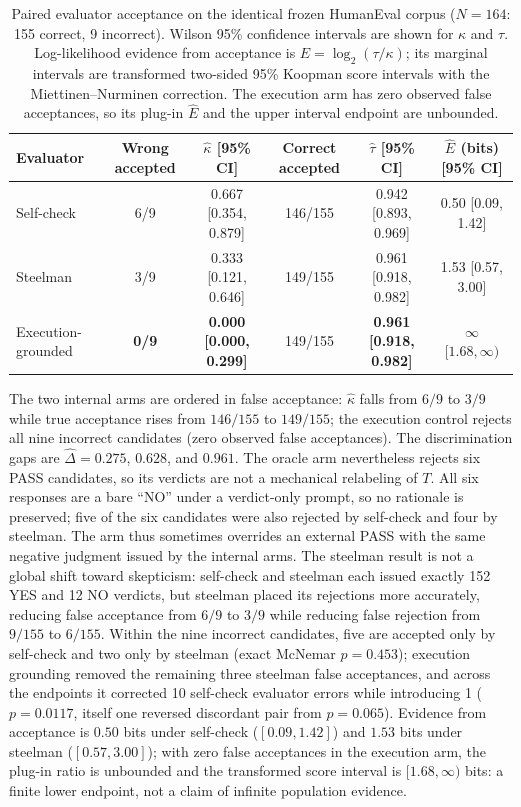 \documentclass[a4paper,journal]{IAENGtran}
\begin{document}
\begin{table}[tp]
\caption{Paired evaluator acceptance on the identical frozen HumanEval corpus
($N=164$: 155 correct, 9 incorrect). Wilson 95\% confidence intervals are shown for
$\kappa$ and $\tau$. Log-likelihood evidence from acceptance is $E=\log_2(\tau/\kappa)$;
its marginal intervals are transformed two-sided 95\% Koopman score intervals with the
Miettinen--Nurminen correction. The execution arm has zero observed false acceptances, so
its plug-in $\hat E$ and the upper interval endpoint are unbounded.}
\label{tab:results}

\begin{tabular}{l c c c c c}
\hline
\textbf{Evaluator} & \textbf{Wrong accepted} & $\hat{\kappa}$ [95\% CI] &
\textbf{Correct accepted} & $\hat{\tau}$ [95\% CI] & $\hat{E}$ (bits) [95\% CI] \\
\hline
Self-check & 6/9 & 0.667 [0.354, 0.879] & 146/155 & 0.942 [0.893, 0.969] & 0.50 [0.09, 1.42] \\
Steelman & 3/9 & 0.333 [0.121, 0.646] & 149/155 & 0.961 [0.918, 0.982] & 1.53 [0.57, 3.00] \\
Execution-grounded & \textbf{0/9} & \textbf{0.000 [0.000, 0.299]} & 149/155 & \textbf{0.961 [0.918, 0.982]} & \textbf{$\infty$ $[1.68,\infty)$} \\
\hline
\end{tabular}
\end{table}

The two internal arms are ordered in false acceptance: $\hat\kappa$ falls from $6/9$
to $3/9$ while true acceptance rises from $146/155$ to $149/155$; the execution control
rejects all nine incorrect candidates (zero observed false acceptances). The discrimination gaps are
$\hat\Delta=0.275$, $0.628$, and $0.961$. The oracle arm nevertheless rejects six
PASS candidates, so its verdicts are not a mechanical relabeling of $T$. All six
responses are a bare ``NO'' under a verdict-only prompt, so no rationale is preserved;
five of the six candidates were also rejected by self-check and four by steelman.
The arm thus sometimes overrides an external PASS with the same negative judgment
issued by the internal arms. The steelman
result is not a global shift toward skepticism: self-check and steelman each issued
exactly 152 YES and 12 NO verdicts, but steelman placed its rejections more accurately,
reducing false acceptance from $6/9$ to $3/9$ while reducing false rejection from
$9/155$ to $6/155$. Within the nine incorrect candidates, five are accepted only by
self-check and two only by steelman (exact McNemar $p=0.453$); execution grounding
removed the remaining three steelman false acceptances, and across the endpoints it
corrected 10 self-check evaluator errors while introducing 1 ($p=0.0117$, itself one
reversed discordant pair from $p=0.065$). Evidence from acceptance is
$0.50$ bits under self-check ($[0.09,1.42]$) and $1.53$ bits under steelman
($[0.57,3.00]$); with zero false acceptances in the execution arm, the plug-in ratio is
unbounded and the transformed score interval is $[1.68,\infty)$ bits: a finite lower
endpoint, not a claim of infinite population evidence.
\end{document}
